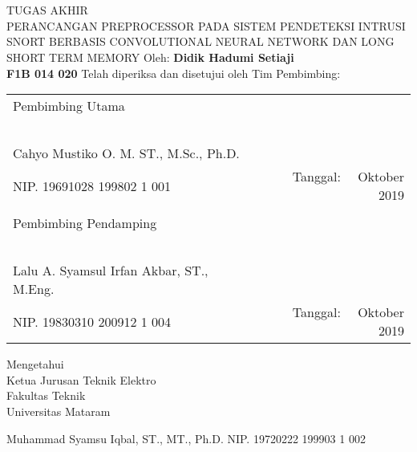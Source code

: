 \documentclass[./skripsi.tex]{subfiles}
\begin{document}
\section*{}
\begin{center}
    TUGAS AKHIR \\
PERANCANGAN PREPROCESSOR PADA SISTEM PENDETEKSI INTRUSI SNORT BERBASIS CONVOLUTIONAL NEURAL NETWORK DAN LONG SHORT TERM MEMORY \linebreak \linebreak
Oleh: \linebreak
\textbf{Didik Hadumi Setiaji}\\
\textbf{F1B 014 020} \linebreak \linebreak
Telah diperiksa dan disetujui oleh Tim Pembimbing:

\end{center}

\begin{tabular}{lr}
Pembimbing Utama \\ \\ \\ \\ \\ \\
Cahyo Mustiko O. M. ST., M.Sc., Ph.D. \\
NIP. 19691028 199802 1 001
& Tanggal: \ \ Oktober 2019 \\
& \\
Pembimbing Pendamping \\ \\ \\ \\ \\ \\
Lalu A. Syamsul Irfan Akbar, ST., M.Eng. \\

NIP. 19830310 200912 1 004
& Tanggal: \ \ Oktober 2019 \\
\end{tabular}
\vfill
\begin{center}
    Mengetahui \\
    Ketua Jurusan Teknik Elektro \\
    Fakultas Teknik \\
    Universitas Mataram \linebreak \linebreak \linebreak \linebreak \linebreak
    
    Muhammad Syamsu Iqbal, ST., MT., Ph.D. \linebreak
    NIP. 19720222 199903 1 002
\end{center}
\clearpage
\end{document}
